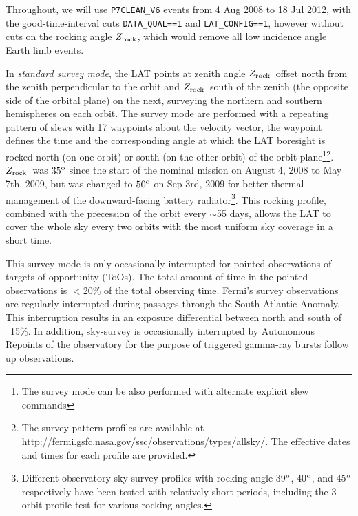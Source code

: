 \documentclass[aps,twocolumn,prd,superscriptaddress,showpacs,nofootinbib,fixfloat]{revtex4}
\newcommand{\degree}{^{\rm o}}
\newcommand{\zrock}{$Z_{\rm rock}$}
\begin{document}
Throughout, we will use \texttt{P7CLEAN\_V6} events from 4 Aug 2008 to 18 Jul
2012, with the good-time-interval cuts \texttt{DATA\_QUAL==1} and
\texttt{LAT\_CONFIG==1}, however without cuts on the
rocking angle \zrock, which would remove all low incidence angle Earth limb events.
\medskip

In \emph{standard survey mode}, the LAT points at zenith angle
\zrock\ offset north from the zenith perpendicular to the
orbit and \zrock\ south of the zenith (the opposite side of
the orbital plane) on the next, surveying the northern and
southern hemispheres on each orbit. The survey mode are
performed with a repeating pattern of slews with 17
waypoints about the velocity vector, the waypoint defines
the time and the corresponding angle at which the LAT
boresight is rocked north (on one orbit) or south (on the
other orbit) of the orbit plane\footnote{The survey mode can
be also performed with alternate explicit slew
commands}\footnote{The survey pattern profiles are available
at
\url{http://fermi.gsfc.nasa.gov/ssc/observations/types/allsky/}.
The effective dates and times for each profile are
provided. }. \zrock\ was $35\degree$ since the start of the
nominal mission on August 4, 2008 to May 7th, 2009, but was
changed to $50\degree$ on Sep 3rd, 2009 for better thermal
management of the downward-facing battery
radiator\footnote{Different observatory sky-survey profiles
with rocking angle 39$\degree$, 40$\degree$, and 45$\degree$
respectively have been tested with relatively short periods,
including the 3 orbit profile test for various rocking
angles.}. This rocking profile, combined with the
precession of the orbit every $\sim$55 days, allows the LAT
to cover the whole sky every two orbits with the most
uniform sky coverage in a short time.

This survey mode is only occasionally interrupted for
pointed observations of targets of opportunity (ToOs). The
total amount of time in the pointed observations is $<$20\%
of the total observing time. Fermi's survey observations are
regularly interrupted during passages through the South
Atlantic Anomaly. This interruption results in an exposure
differential between north and south of ~15\%. In addition,
sky-survey is occasionally interrupted by Autonomous
Repoints of the observatory for the purpose of triggered
gamma-ray bursts follow up observations.
\medskip
\end{document}
